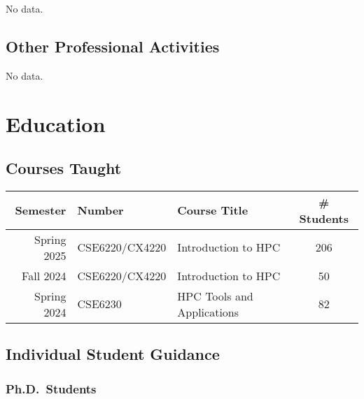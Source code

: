No data.

\subsection{Other Professional Activities}

No data.
\section{Education}
\begin{adjustwidth}{2em}{0pt}

\subsection{Courses Taught}

\begin{center}
    \begin{tabular}{ r l l c }
        \hline\hline
        \bf Semester  &\bf Number & \bf Course Title & \bf \# Students \\
        \hline
        Spring 2025 & CSE6220/CX4220 & Introduction to HPC & 206 \\
        Fall 2024 & CSE6220/CX4220 & Introduction to HPC & 50 \\
        Spring 2024 & CSE6230 & HPC Tools and Applications & 82 \\
        \hline\hline
    \end{tabular}
\end{center}

\subsection{Individual Student Guidance}


\subsubsection{Ph.D.\ Students}


\end{adjustwidth}
